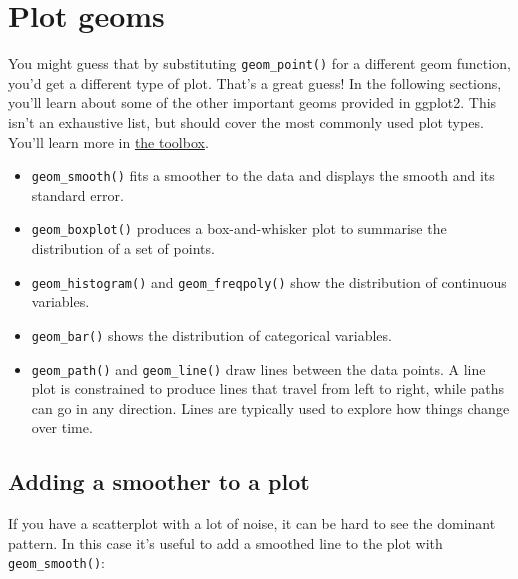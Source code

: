 \hypertarget{sec:plot-geoms}{\section{Plot geoms}\label{sec:plot-geoms}}

You might guess that by substituting \texttt{geom\_point()} for a
different geom function, you'd get a different type of plot. That's a
great guess! In the following sections, you'll learn about some of the
other important geoms provided in ggplot2. This isn't an exhaustive
list, but should cover the most commonly used plot types. You'll learn
more in \protect\hyperlink{cha:toolbox}{the toolbox}.

\begin{itemize}
\item
  \texttt{geom\_smooth()} fits a smoother to the data and displays the
  smooth and its standard error.
\item
  \texttt{geom\_boxplot()} produces a box-and-whisker plot to summarise
  the distribution of a set of points.
\item
  \texttt{geom\_histogram()} and \texttt{geom\_freqpoly()} show the
  distribution of continuous variables.
\item
  \texttt{geom\_bar()} shows the distribution of categorical variables.
\item
  \texttt{geom\_path()} and \texttt{geom\_line()} draw lines between the
  data points. A line plot is constrained to produce lines that travel
  from left to right, while paths can go in any direction. Lines are
  typically used to explore how things change over time.
\end{itemize}

\subsection{Adding a smoother to a plot}\label{sub:smooth}

If you have a scatterplot with a lot of noise, it can be hard to see the
dominant pattern. In this case it's useful to add a smoothed line to the
plot with \texttt{geom\_smooth()}: 

\begin{Shaded}
\begin{Highlighting}[]
\StringTok{ }
\StringTok{  }\NormalTok{() +}\StringTok{ }
\StringTok{  }\NormalTok{()}
\end{Highlighting}
\end{Shaded}

